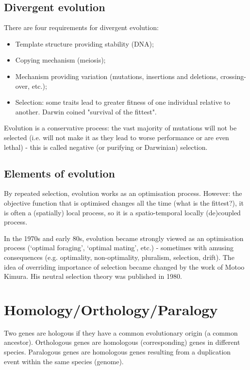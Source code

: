 \subsection{Divergent evolution}

There are four requirements for divergent evolution:

\begin{itemize}
\item Template structure providing stability (DNA);
\item Copying mechanism (meiosis);
\item Mechanism providing variation (mutations, insertions and deletions, 
crossing-over, etc.);
\item Selection: some traits lead to greater fitness of one individual 
relative to another. Darwin coined "survival of the fittest".
\end{itemize}

Evolution is a conservative process: the vast majority of mutations will not 
be selected (i.e. will not make it as they lead to worse performance or are 
even lethal) - this is called negative (or purifying or Darwinian) selection.

\subsection{Elements of evolution}

By repeated selection, evolution works as an optimisation process. However: 
the objective function that is optimised changes all the time (what is the 
fittest?), it is often a (spatially) local process, so it is a spatio-temporal 
locally (de)coupled process.

In the 1970s and early 80s, evolution became strongly viewed as an optimisation 
process (`optimal foraging', `optimal mating', etc.) - sometimes with amusing
consequences (e.g. optimality, non-optimality, pluralism, selection, drift).
The idea of overriding importance of selection became changed by the work of 
Motoo Kimura. His neutral selection theory was published in 1980.

\section{Homology/Orthology/Paralogy}

Two genes are hologous if they have a common evolutionary origin (a common 
ancestor). Orthologous genes are homologous (corresponding) genes in different 
species. Paralogous genes are homologous genes resulting from a duplication 
event within the same species (genome).

